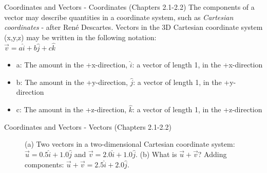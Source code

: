 \documentclass{beamer}
\begin{document}
\begin{frame}{Coordinates and Vectors - Coordinates (Chapters 2.1-2.2)}
\small
The components of a vector may describe quantities in a \alert{coordinate system}, such as \textit{Cartesian coordinates} - after Ren\'e Descartes.  Vectors in the 3D Cartesian coordinate system (x,y,z) may be written in the following notation:
\\
\vspace{0.2cm}
$\boxed{\vec{v} = a\hat{i} + b\hat{j} + c\hat{k}}$
\\
\begin{itemize}
\item a: The amount in the +x-direction, $\hat{i}$: a vector of length 1, in the +x-direction
\item b: The amount in the +y-direction, $\hat{j}$: a vector of length 1, in the +y-direction
\item c: The amount in the +z-direction, $\hat{k}$: a vector of length 1, in the +z-direction
\end{itemize}
\end{frame}

\begin{frame}{Coordinates and Vectors - Vectors (Chapters 2.1-2.2)}
\begin{figure}
\centering
{}
\caption{\label{fig:twovectors} (a) Two vectors in a two-dimensional Cartesian coordinate system: $\vec{u} = 0.5\hat{i}+1.0\hat{j}$ and $\vec{v} = 2.0\hat{i}+1.0\hat{j}$.  (b) What is $\vec{u}+\vec{v}$?  Adding components: $\vec{u}+\vec{v} = 2.5\hat{i}+2.0\hat{j}$.}
\end{figure}
\end{frame}
\end{document}
